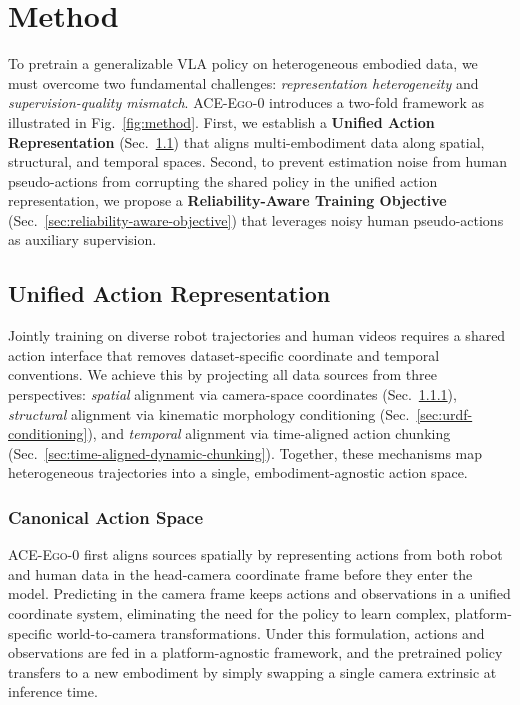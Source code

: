 \documentclass{article}
\newcommand{\OURS}{\textsc{ACE-Ego-0}\xspace}
\newcommand{\Ours}{\OURS}
\begin{document}
\section{Method}
To pretrain a generalizable VLA policy on heterogeneous embodied data, we must overcome two fundamental challenges: \emph{representation heterogeneity} and \emph{supervision-quality mismatch}. \Ours introduces a two-fold framework as illustrated in Fig.~\ref{fig:method}. First, we establish a \textbf{Unified Action Representation} (Sec.~\ref{sec:unified-interface}) that aligns multi-embodiment data along spatial, structural, and temporal spaces. Second, to prevent estimation noise from human pseudo-actions from corrupting the shared policy in the unified action representation, we propose a \textbf{Reliability-Aware Training Objective} (Sec.~\ref{sec:reliability-aware-objective}) that leverages noisy human pseudo-actions as auxiliary supervision.

\subsection{Unified Action Representation}
\label{sec:unified-interface}

Jointly training on diverse robot trajectories and human videos requires a shared action interface that removes dataset-specific coordinate and temporal conventions. We achieve this by projecting all data sources from three perspectives: \emph{spatial} alignment via camera-space coordinates (Sec.~\ref{sec:camera-space-action}), \emph{structural} alignment via kinematic morphology conditioning (Sec.~\ref{sec:urdf-conditioning}), and \emph{temporal} alignment via time-aligned action chunking (Sec.~\ref{sec:time-aligned-dynamic-chunking}). Together, these mechanisms map heterogeneous trajectories into a single, embodiment-agnostic action space.

\subsubsection{Canonical Action Space}
\label{sec:camera-space-action}

\Ours first aligns sources spatially by representing actions from both robot and human data in the head-camera coordinate frame before they enter the model. Predicting in the camera frame keeps actions and observations in a unified coordinate system, eliminating the need for the policy to learn complex, platform-specific world-to-camera transformations. Under this formulation, actions and observations are fed in a platform-agnostic framework, and the pretrained policy transfers to a new embodiment by simply swapping a single camera extrinsic at inference time.
\end{document}
